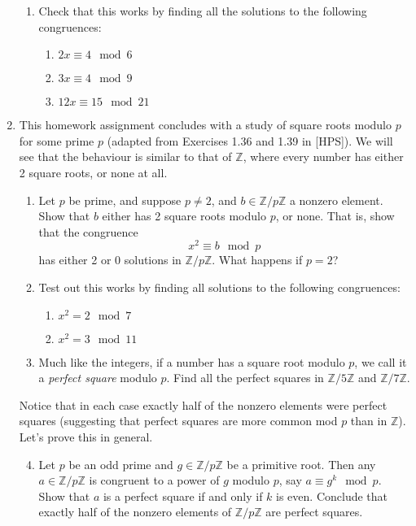 \documentclass[11pt]{article}
\newcommand{\bZ}{\mathbb{Z}}
\begin{document}
\begin{enumerate}
{\begin{enumerate}
{    }
    \item{
    Check that this works by finding all the solutions to the following congruences:
    \begin{enumerate}
      \item{$2x\equiv 4\mod 6$}
      \item{$3x\equiv 4\mod 9$}
      \item{$12x\equiv15\mod 21$}
    \end{enumerate}
    }
  \end{enumerate}
  }
  \item{
  This homework assignment concludes with a study of square roots modulo $p$ for some prime $p$ (adapted from Exercises 1.36 and 1.39 in [HPS]).  We will see that the behaviour is similar to that of $\bZ$, where every number has either 2 square roots, or none at all.
  \begin{enumerate}
    \item{
    Let $p$ be prime, and suppose $p\not=2$, and $b\in\bZ/p\bZ$ a nonzero element.  Show that $b$ either has 2 square roots modulo $p$, or none.  That is, show that the congruence
    \[x^2\equiv b\mod p\]
    has either 2 or 0 solutions in $\bZ/p\bZ$.  What happens if $p=2$?
    }
    \item{
    Test out this works by finding all solutions to the following congruences:
    \begin{enumerate}
      \item{$x^2 = 2\mod7$}
      \item{$x^2 = 3\mod11$}
    \end{enumerate}
    }
    \item{
    Much like the integers, if a number has a square root modulo $p$, we call it a \textit{perfect square} modulo $p$.  Find all the perfect squares in $\bZ/5\bZ$ and $\bZ/7\bZ$.
    }
  \end{enumerate}
  Notice that in each case exactly half of the nonzero elements were perfect squares (suggesting that perfect squares are more common mod $p$ than in $\bZ$).  Let's prove this in general.
  \begin{enumerate}
    \setcounter{enumii}{3}
    \item{
    Let $p$ be an odd prime and $g\in\bZ/p\bZ$ be a primitive root.  Then any $a\in\bZ/p\bZ$ is congruent to a power of $g$ modulo $p$, say $a\equiv g^k\mod p$.  Show that $a$ is a perfect square if and only if $k$ is even.  Conclude that exactly half of the nonzero elements of $\bZ/p\bZ$ are perfect squares.
    }
  \end{enumerate}
}
\end{enumerate}
\end{document}
